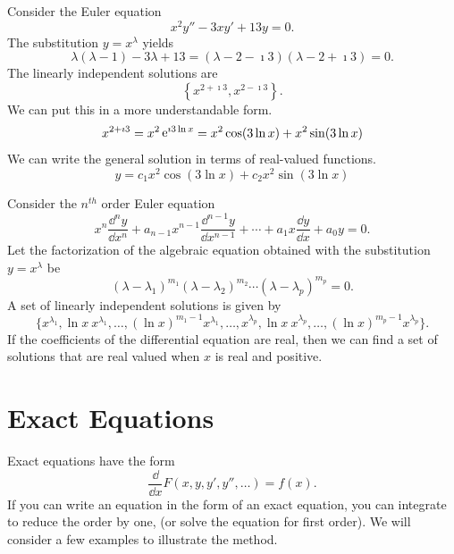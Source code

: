 \begin{Example}
  Consider the Euler equation
  \[
  x^2 y'' - 3 x y' + 13 y = 0.
  \]
  The substitution $y = x^\lambda$ yields
  \[ 
  \lambda(\lambda-1) - 3 \lambda + 13 = (\lambda - 2 - \imath 3)(\lambda - 2 + \imath 3) = 0.
  \]
  The linearly independent solutions are
  \[ 
  \left\{ x^{2 + \imath 3}, x^{2 - \imath 3} \right\}.
  \]
  We can put this in a more understandable form.
  \[ 
  x^{2 + \imath 3} = x^2 \mathop{\mathrm{e}}\nolimits^{\imath 3 \ln x} = x^2 \cos(3 \ln x) + x^2 \sin(3 \ln x)
  \]
  We can write the general solution in terms of real-valued functions.
  \[ 
  \boxed{ 
    y = c_1 x^2 \cos (3 \ln x) + c_2 x^2 \sin (3 \ln x)
    } 
  \]
\end{Example}







\begin{Result}
  Consider the $n^{t h}$ order Euler equation
  \[ 
  x^n \frac{\dd^n y}{\dd x^n} + a_{n-1} x^{n-1} \frac{\dd^{n-1} y}{\dd x^{n-1}}
  + \cdots + a_1 x \frac{\dd y}{\dd x} + a_0 y = 0.
  \]
  Let the factorization of the algebraic equation obtained with the substitution
  $y = x^\lambda$ be
  \[ 
  (\lambda-\lambda_1)^{m_1}(\lambda-\lambda_2)^{m_2} \cdots (\lambda-\lambda_p)^{m_p} = 0.
  \]
  A set of linearly independent solutions is given by
  \[ 
  \{ x^{\lambda_1}, \ln x\ x^{\lambda_1}, \ldots, (\ln x)^{m_1-1}x^{\lambda_1},
  \ldots, x^{\lambda_p}, \ln x\ x^{\lambda_p}, \ldots, (\ln x)^{m_p-1}x^{\lambda_p}\}.
  \]
  If the coefficients of the differential equation are real, then we can find
  a set of solutions that are real valued when $x$ is real and positive.
\end{Result}












\section{Exact Equations}




Exact equations have the form
\[ 
\frac{\dd}{\dd x}F(x, y, y', y'', \ldots) = f(x).
\]
If you can write an equation in the form of an exact equation, you can 
integrate to reduce the order by one, (or solve the equation for first order). 
We will consider a few examples to illustrate the method.



